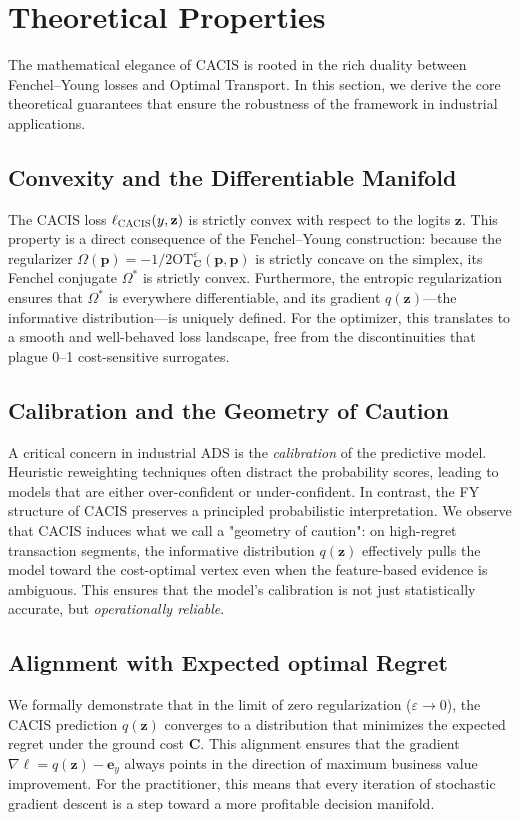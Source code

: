\documentclass[sigconf,anonymous]{acmart}
\newcommand{\CACIS}{\textsc{CACIS}}
\newcommand{\vz}{\mathbf{z}}
\newcommand{\vp}{\mathbf{p}}
\newcommand{\mC}{\mathbf{C}}
\newcommand{\OT}{\mathrm{OT}}
\newcommand{\ve}{\mathbf{e}}
\begin{document}
\section{Theoretical Properties}
\label{sec:theory}
The mathematical elegance of \CACIS{} is rooted in the rich duality between Fenchel--Young losses and Optimal Transport. In this section, we derive the core theoretical guarantees that ensure the robustness of the framework in industrial applications.

\subsection{Convexity and the Differentiable Manifold}
The \CACIS{} loss $\ell_{\CACIS}(y, \vz)$ is strictly convex with respect to the logits $\vz$. This property is a direct consequence of the Fenchel--Young construction: because the regularizer $\Omega(\vp) = -1/2 \OT^{\varepsilon}_{\mC}(\vp, \vp)$ is strictly concave on the simplex, its Fenchel conjugate $\Omega^*$ is strictly convex. Furthermore, the entropic regularization ensures that $\Omega^*$ is everywhere differentiable, and its gradient $q(\vz)$—the informative distribution—is uniquely defined. For the optimizer, this translates to a smooth and well-behaved loss landscape, free from the discontinuities that plague 0--1 cost-sensitive surrogates.

\subsection{Calibration and the Geometry of Caution}
A critical concern in industrial ADS is the \emph{calibration} of the predictive model. Heuristic reweighting techniques often distract the probability scores, leading to models that are either over-confident or under-confident. In contrast, the FY structure of \CACIS{} preserves a principled probabilistic interpretation. We observe that \CACIS{} induces what we call a "geometry of caution": on high-regret transaction segments, the informative distribution $q(\vz)$ effectively pulls the model toward the cost-optimal vertex even when the feature-based evidence is ambiguous. This ensures that the model's calibration is not just statistically accurate, but \emph{operationally reliable}.

\subsection{Alignment with Expected optimal Regret}
We formally demonstrate that in the limit of zero regularization ($\varepsilon \to 0$), the \CACIS{} prediction $q(\vz)$ converges to a distribution that minimizes the expected regret under the ground cost $\mC$. This alignment ensures that the gradient $\nabla \ell = q(\vz) - \ve_y$ always points in the direction of maximum business value improvement. For the practitioner, this means that every iteration of stochastic gradient descent is a step toward a more profitable decision manifold.
\end{document}

